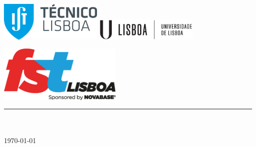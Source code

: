 \documentclass[11pt, a4paper]{article}
\begin{document}
\begin{titlepage}

	\includegraphics[width=5cm]{ist.eps}
	\hfill
	\includegraphics[width=5cm]{ulisboa.eps}
    \hspace{3mm}
	\vspace{2cm}
	\begin{center}
		\includegraphics[width=6cm]{Logo-FST-Lisboa.eps}
	\end{center}
	\color{FSTRed}\rule{\textwidth}{2pt}
	\color{black}
	\begin{center}
		{\Huge\textbf{\Title}}\\

		\vfill
	\Large \Author\\
		\vspace{1cm}
	\Large \today\\
		\vspace{1cm}
	\end{center}

\end{titlepage}


\tableofcontents

%
%
\end{document}

